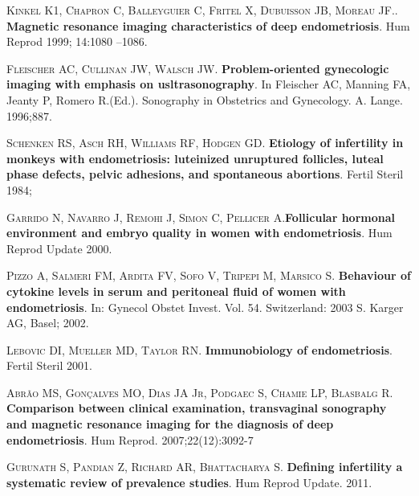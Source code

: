 \documentclass[12pt]{article} %
\begin{document}
\textsc{Kinkel K1, Chapron C, Balleyguier C, Fritel X, Dubuisson JB, Moreau JF}.. \textbf{Magnetic resonance imaging characteristics of deep endometriosis}. Hum Reprod 1999; 14:1080 –1086.

\vspace{0,5cm}

\textsc{Fleischer AC, Cullinan JW, Walsch JW}.\textbf{ Problem-oriented gynecologic imaging with emphasis on usltrasonography}. In Fleischer AC, Manning FA, Jeanty P, Romero R.(Ed.). Sonography in Obstetrics and Gynecology. A.
Lange. 1996;887.

\vspace{0,5cm}

\textsc{Schenken RS, Asch RH, Williams RF, Hodgen GD}.\textbf{ Etiology of infertility in
monkeys with endometriosis: luteinized unruptured follicles, luteal phase
defects, pelvic adhesions, and spontaneous abortions}. Fertil Steril 1984;

\vspace{0,5cm}

\textsc{Garrido N, Navarro J, Remohi J, Simon C, Pellicer A}.\textbf{Follicular hormonal
environment and embryo quality in women with endometriosis}. Hum
Reprod Update 2000.

\vspace{0,5cm}

\textsc{Pizzo A, Salmeri FM, Ardita FV, Sofo V, Tripepi M, Marsico S}. \textbf{Behaviour of
cytokine levels in serum and peritoneal fluid of women with endometriosis}.
In: Gynecol Obstet Invest. Vol. 54. Switzerland: 2003 S. Karger AG, Basel;
2002.

\vspace{0,5cm}

\textsc{Lebovic DI, Mueller MD, Taylor RN}.\textbf{ Immunobiology of endometriosis}. Fertil
Steril 2001.

\vspace{0,5cm}

\textsc{Abrão MS, Gonçalves MO, Dias JA Jr, Podgaec S, Chamie LP, Blasbalg R}. \textbf{Comparison between clinical examination, transvaginal sonography and magnetic resonance imaging for the diagnosis of
deep endometriosis}. Hum Reprod. 2007;22(12):3092-7

\vspace{0,5cm}

\textsc{Gurunath S, Pandian Z, Richard AR, Bhattacharya S}. \textbf{Defining infertility a systematic review of prevalence studies}. Hum Reprod Update. 2011.
\end{document}
